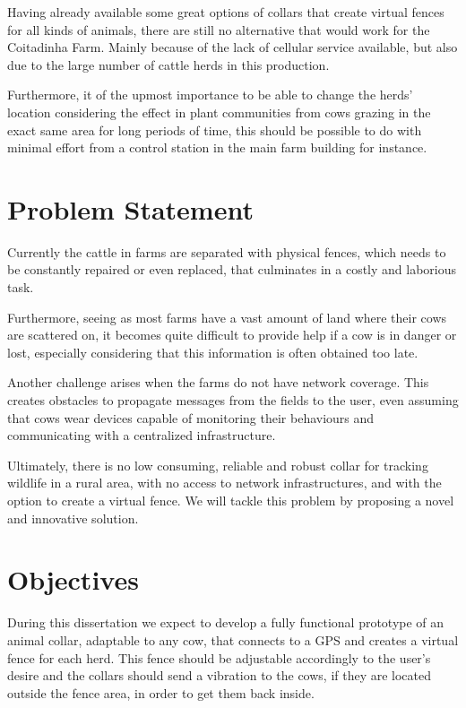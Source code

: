 Having already available some great options of collars that create virtual fences for all
kinds of animals, there are still no alternative that would work for the Coitadinha Farm.
Mainly because of the lack of cellular service available, but also due to the large number
of cattle herds in this production.

Furthermore, it of the upmost importance to be able to change the herds' location considering
the effect in plant communities from cows grazing in the exact same area for long periods
of time, this should be possible to do with minimal effort from a control station in the main
farm building for instance.


\section{Problem Statement}
\label{sec:problem_statement}
Currently the cattle in farms are separated with physical fences, which needs to be constantly
repaired or even replaced, that culminates in a costly and laborious task.

Furthermore, seeing as most farms have a vast amount of land where their cows are scattered on,
it becomes quite difficult to provide help if a cow is in danger or lost, especially considering
that this information is often obtained too late.

Another challenge arises when the farms do not have network coverage. This creates obstacles
to propagate messages from the fields to the user, even assuming that cows wear devices
capable of monitoring their behaviours and communicating with a centralized infrastructure.

Ultimately, there is no low consuming, reliable and robust collar for tracking wildlife in a
rural area, with no access to network infrastructures, and with the option to create a virtual
fence. We will tackle this problem by proposing a novel and innovative solution.

\section{Objectives}
\label{sec:objectives}
During this dissertation we expect to develop a fully functional prototype of an animal collar,
adaptable to any cow, that connects to a \Gls{GPS} and creates a virtual fence for each herd. This
fence should be adjustable accordingly to the user's desire and the collars should send a
vibration to the cows, if they are located outside the fence area, in order to get them back
inside.

